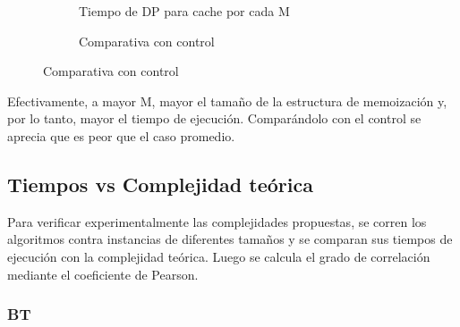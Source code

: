 \begin{figure}[H]
    \centering
    \begin{subfigure}[b]{0.45\textwidth}
        \centering
        
        \caption{Tiempo de DP para cache por cada M}
    \end{subfigure}
    \begin{subfigure}[b]{0.45\textwidth}
        \centering
        
        \caption{Comparativa con control}
    \end{subfigure}
\end{figure}

Efectivamente, a mayor M, mayor el tamaño de la estructura de memoización y, por lo tanto, mayor el tiempo de ejecución. Comparándolo con el control se aprecia que es peor que el caso promedio.

\subsection{Tiempos vs Complejidad teórica}

Para verificar experimentalmente las complejidades propuestas, se corren los algoritmos contra instancias de diferentes tamaños y se comparan sus tiempos de ejecución con la complejidad teórica. Luego se calcula el grado de correlación mediante el coeficiente de Pearson.

\subsubsection{BT}

